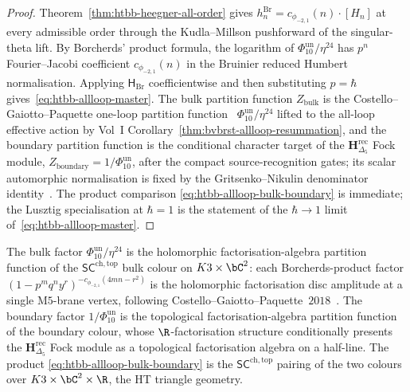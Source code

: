 \begin{proof}
Theorem~\ref{thm:htbb-heegner-all-order} gives
$h_n^{\mathrm{Br}} = c_{\phi_{-2,1}}(n)\cdot[H_n]$ at every
admissible order through the Kudla--Millson pushforward of the
singular-theta lift. By Borcherds' product formula, the logarithm of
$\Phi_{10}^{\mathrm{un}}/\eta^{24}$ has $p^n$ Fourier--Jacobi
coefficient $c_{\phi_{-2,1}}(n)$ in the Bruinier reduced Humbert
normalisation. Applying $\mathsf H_{\mathrm{Br}}$ coefficientwise and
then substituting $p=\hbar$ gives~\eqref{eq:htbb-allloop-master}. The
bulk partition function
$Z_{\mathrm{bulk}}$ is the Costello--Gaiotto--Paquette one-loop
partition function~\cite[\S 7]{CostelloGaiottoPaquette2018}
$\Phi_{10}^{\mathrm{un}}/\eta^{24}$ lifted to the all-loop effective action by
Vol~I Corollary~\ref{thm:bvbrst-allloop-resummation}, and the
boundary partition function is the conditional character target of the
$\mathbf{H}_{\Delta_5}^{\mathrm{rec}}$ Fock module,
$Z_{\mathrm{boundary}} = 1/\Phi_{10}^{\mathrm{un}}$, after the compact
source-recognition gates; its scalar automorphic normalisation is fixed
by the Gritsenko--Nikulin denominator
identity~\cite[\S 1]{GritsenkoNikulin1998}. The product comparison
\eqref{eq:htbb-allloop-bulk-boundary} is immediate; the Lusztig
specialisation at $\hbar = 1$ is the statement of the $\hbar\to 1$
limit of~\eqref{eq:htbb-allloop-master}.
\end{proof}

\begin{remark}
\label{rem:htbb-allloop-sc-factorisation}
The bulk factor $\Phi_{10}^{\mathrm{un}}/\eta^{24}$ is the holomorphic
factorisation-algebra partition function of the
$\mathsf{SC}^{\mathrm{ch,top}}$ bulk colour on $K3\times\bC^2$: each
Borcherds-product factor $(1 - p^mq^ny^r)^{-c_{\phi_{-2,1}}(4mn-r^2)}$
is the holomorphic factorisation disc amplitude at a single
M$5$-brane vertex, following
Costello--Gaiotto--Paquette~$2018$~\cite[\S 6]{CostelloGaiottoPaquette2018}.
The boundary factor $1/\Phi_{10}^{\mathrm{un}}$ is the topological
factorisation-algebra partition function of the boundary colour,
whose $\R$-factorisation structure conditionally presents the
$\mathbf{H}_{\Delta_5}^{\mathrm{rec}}$ Fock module as a topological
factorisation algebra on a half-line. The product
\eqref{eq:htbb-allloop-bulk-boundary} is the
$\mathsf{SC}^{\mathrm{ch,top}}$ pairing of the two colours over
$K3\times\bC^2\times\R$, the HT triangle geometry.
\end{remark}

